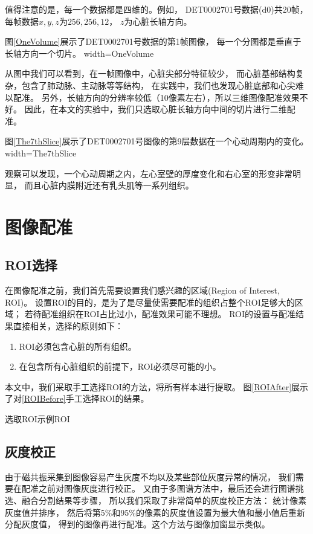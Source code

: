值得注意的是，每一个数据都是四维的。例如，
DET0002701号数据(d0)共20帧，每帧数据$x,y,z$为$256,256,12$，
$z$为心脏长轴方向。

图\ref{OneVolume}展示了DET0002701号数据的第1帧图像，
每一个分图都是垂直于长轴方向一个切片。
%
{width=\textwidth}{OneVolume}

从图中我们可以看到，在一帧图像中，心脏尖部分特征较少，
而心脏基部结构复杂，包含了肺动脉、主动脉等等结构，
在实践中，我们也发现心脏底部和心尖难以配准。
另外，长轴方向的分辨率较低（10像素左右），所以三维图像配准效果不好。
因此，在本文的实验中，我们只选取心脏长轴方向中间的切片进行二维配准。

图\ref{The7thSlice}展示了DET0002701号图像的第9层数据在一个心动周期内的变化。
%
{width=\textwidth}{The7thSlice}

观察可以发现，一个心动周期之内，左心室壁的厚度变化和右心室的形变非常明显，
而且心脏内膜附近还有乳头肌等一系列组织。


\section{图像配准}
\subsection{ROI选择}
在图像配准之前，我们首先需要设置我们感兴趣的区域(Region of Interest, ROI)。
设置ROI的目的，是为了是尽量使需要配准的组织占整个ROI足够大的区域；
若待配准组织在ROI占比过小，配准效果可能不理想。
ROI的设置与配准结果直接相关，选择的原则如下：
\begin{enumerate}
  \item ROI必须包含心脏的所有组织。
  \item 在包含所有心脏组织的前提下，ROI必须尽可能的小。
\end{enumerate}

本文中，我们采取手工选择ROI的方法，将所有样本进行提取。
图\ref{ROIAfter}展示了对\ref{ROIBefore}手工选择ROI的结果。
\begin{pics}[htbp]{选取ROI示例}{ROI}
\end{pics}

\subsection{灰度校正}
由于磁共振采集到图像容易产生灰度不均以及某些部位灰度异常的情况，
我们需要在配准之前对图像灰度进行校正。
又由于多图谱方法中，最后还会进行图谱挑选、融合分割结果等步骤，
所以我们采取了非常简单的灰度校正方法：
统计像素灰度值并排序，
然后将第5\%和95\%的像素的灰度值设置为最大值和最小值后重新分配灰度值，
得到的图像再进行配准。这个方法与图像加窗显示类似。

